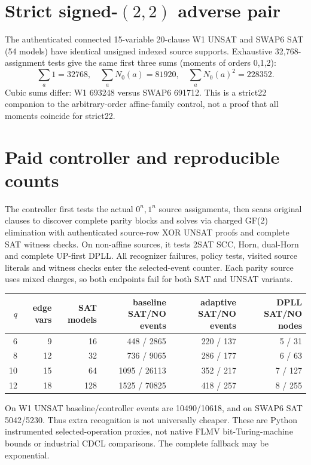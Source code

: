 \documentclass[11pt]{article}
\begin{document}
\section{Strict signed-$(2,2)$ adverse pair}
The authenticated connected 15-variable 20-clause W1 UNSAT and SWAP6 SAT (54 models) have identical unsigned indexed source supports. Exhaustive 32,768-assignment tests give the same first three sums (moments of orders 0,1,2):
\[
\sum_a1=32768,\quad \sum_aN_0(a)=81920,\quad
\sum_aN_0(a)^2=228352.
\]
Cubic sums differ: W1 693248 versus SWAP6 691712. This is a strict22 companion to the arbitrary-order affine-family control, not a proof that all moments coincide for strict22.

\section{Paid controller and reproducible counts}
The controller first tests the actual $0^n,1^n$ source assignments, then scans original clauses to discover complete parity blocks and solves via charged GF(2) elimination with authenticated source-row XOR UNSAT proofs and complete SAT witness checks. On non-affine sources, it tests 2SAT SCC, Horn, dual-Horn and complete UP-first DPLL. All recognizer failures, policy tests, visited source literals and witness checks enter the selected-event counter. Each parity source uses mixed charges, so both endpoints fail for both SAT and UNSAT variants.
\begin{center}\small
\begin{tabular}{rrrrrr}
\toprule $q$ & edge vars & SAT models & baseline SAT/NO events & adaptive SAT/NO events & DPLL SAT/NO nodes\\\midrule
6&9&16&448 / 2865&220 / 137&5 / 31\\
8&12&32&736 / 9065&286 / 177&6 / 63\\
10&15&64&1095 / 26113&352 / 217&7 / 127\\
12&18&128&1525 / 70825&418 / 257&8 / 255\\\bottomrule
\end{tabular}
\end{center}
On W1 UNSAT baseline/controller events are 10490/10618, and on SWAP6 SAT 5042/5230. Thus extra recognition is not universally cheaper. These are Python instrumented selected-operation proxies, not native FLMV bit-Turing-machine bounds or industrial CDCL comparisons. The complete fallback may be exponential.
\end{document}
